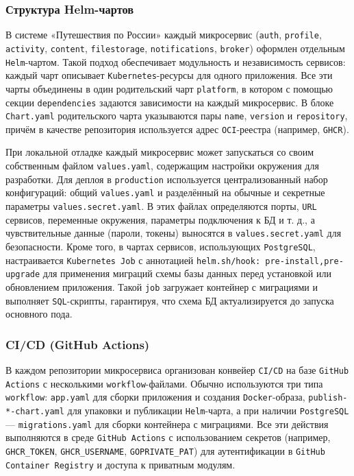 \subsubsection*{Структура Helm-чартов}
В системе «Путешествия по России» каждый микросервис (\texttt{auth}, \texttt{profile}, \texttt{activity}, \texttt{content}, \texttt{filestorage}, \texttt{notifications}, \texttt{broker}) оформлен отдельным \texttt{Helm}-чартом. Такой подход обеспечивает модульность и независимость сервисов: каждый чарт описывает \texttt{Kubernetes}-ресурсы для одного приложения. Все эти чарты объединены в один родительский чарт \texttt{platform}, в котором с помощью секции \texttt{dependencies} задаются зависимости на каждый микросервис. В блоке \texttt{Chart.yaml} родительского чарта указываются пары \texttt{name}, \texttt{version} и \texttt{repository}, причём в качестве репозитория используется адрес \texttt{OCI}-реестра (например, \texttt{GHCR}). 

При локальной отладке каждый микросервис может запускаться со своим собственным файлом \texttt{values.yaml}, содержащим настройки окружения для разработки. Для деплоя в \texttt{production} используется централизованный набор конфигураций: общий \texttt{values.yaml} и разделённый на обычные и секретные параметры \texttt{values.secret.yaml}. В этих файлах определяются порты, \texttt{URL} сервисов, переменные окружения, параметры подключения к БД и т. д., а чувствительные данные (пароли, токены) выносятся в \texttt{values.secret.yaml} для безопасности. Кроме того, в чартах сервисов, использующих \texttt{PostgreSQL}, настраивается \texttt{Kubernetes Job} с аннотацией \texttt{helm.sh/hook: pre-install,pre-upgrade} для применения миграций схемы базы данных перед установкой или обновлением приложения. Такой \texttt{job} загружает контейнер с миграциями и выполняет \texttt{SQL}-скрипты, гарантируя, что схема БД актуализируется до запуска основного пода.

\subsubsection*{CI/CD (GitHub Actions)}
В каждом репозитории микросервиса организован конвейер \texttt{CI/CD} на базе \texttt{GitHub Actions} с несколькими \texttt{workflow}-файлами. Обычно используются три типа \texttt{workflow}: \texttt{app.yaml} для сборки приложения и создания \texttt{Docker}-образа, \texttt{publish-*-chart.yaml} для упаковки и публикации \texttt{Helm}-чарта, а при наличии \texttt{PostgreSQL} — \texttt{migrations.yaml} для сборки контейнера с миграциями. Все эти действия выполняются в среде \texttt{GitHub Actions} с использованием секретов (например, \texttt{GHCR\_TOKEN}, \texttt{GHCR\_USERNAME}, \texttt{GOPRIVATE\_PAT}) для аутентификации в \texttt{GitHub Container Registry} и доступа к приватным модулям.

